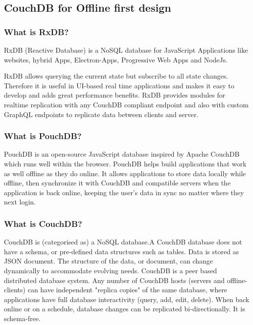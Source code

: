 \subsection{CouchDB for Offline first design}

\subsubsection{What is RxDB?}

RxDB (Reactive Database) is a NoSQL database for JavaScript Applications 
like websites, hybrid Apps, Electron-Apps, Progressive Web Apps and NodeJs.

RxDB allows querying the current state but subscribe to all state changes.
Therefore it is useful in UI-based real time applications and makes it easy to develop 
and adds great performance benefits.
RxDB provides modules for realtime replication with any CouchDB compliant endpoint and 
also with custom GraphQL endpoints to replicate data between clients and server.~\cite{RxDB}

\subsubsection{What is PouchDB?}

PouchDB is an open-source JavaScript database inspired by Apache CouchDB which 
runs well within the browser. PouchDB helps build applications that work as well 
offline as they do online. It allows applications to store data locally while offline, 
then synchronize it with CouchDB and compatible servers when the application is back 
online, keeping the user's data in sync no matter where they next login.~\cite{PouchGuide}

\subsubsection{What is CouchDB?}

CouchDB is (categorised as) a NoSQL database.A CouchDB database does not have a schema, 
or pre-defined data structures such as tables. Data is stored as JSON document. 
The structure of the data, or document, can change dynamically to accommodate evolving needs.  
CouchDB is a peer based distributed database system. Any number of CouchDB hosts 
(servers and offline-clients) can have independent "replica copies" of the same database, 
where applications have full database interactivity (query, add, edit, delete). 
When back online or on a schedule, database changes can be replicated bi-directionally.
It is schema-free.~\cite{CouchConfluence}

